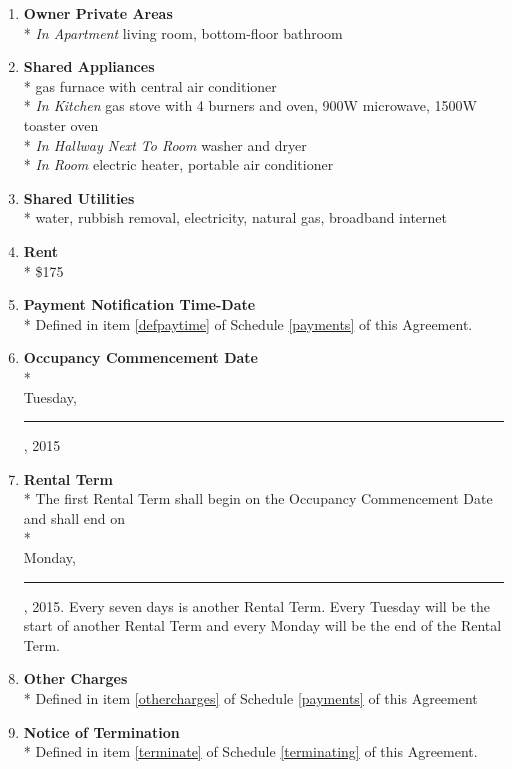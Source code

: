 \documentclass[]{article}
\newcommand{\datefillin}{\hspace{0.2cm}\rule{3cm}{.1pt}}
\newcommand{\apt}{Apartment}
\newcommand{\room}{Room}
\newcommand{\livingroom}{Owner Private Areas}
\newcommand{\appliances}{Shared Appliances}
\newcommand{\utilities}{Shared Utilities}
\newcommand{\firstday}{Occupancy Commencement Date}
\newcommand{\rentweek}{Rental Term}
\newcommand{\rent}{\$175}
\newcommand{\paymenttime}{Payment Notification Time-Date}
\begin{document}
\begin{multicols}{2}
\begin{enumerate}
		\item \textbf{\livingroom{}}\\* \label{livingroom}
			\textit{In \apt{}}
			living room,
			bottom-floor bathroom
			
		\item \textbf{\appliances}\\* \label{appliances}
			gas furnace with central air conditioner\\*
			\textit{In Kitchen} 
			gas stove with 4 burners and oven, 
			900W microwave,
			1500W toaster oven\\*
			\textit{In Hallway Next To \room{}}
			washer and dryer\\*
			\textit{In \room{}} 
			electric heater,
			portable air conditioner
			
		\item \textbf{\utilities{}}\\* \label{utilities}
			water,
			rubbish removal,
			electricity,
			natural gas,
			broadband internet

		\item \textbf{Rent}\\* \label{rent}
			\rent{}

		\item \textbf{\paymenttime{}}\\* \label{paymenttime}
			Defined in item \ref{defpaytime} of Schedule \ref{payments} of this Agreement.

		\item \textbf{\firstday{}} \label{firstday} \\* \\
			Tuesday, \datefillin, 2015

		\item \textbf{\rentweek{}}\\* \label{rentweek}
			The first \rentweek{} shall begin on the \firstday{} and shall end on \\* \\
			Monday, \datefillin, 2015. Every seven days is another \rentweek{}. Every Tuesday will be the start of another \rentweek{} and every Monday will be the end of the \rentweek{}.
			
		\item \textbf{Other Charges}\\*
			Defined in item \ref{othercharges} of Schedule \ref{payments} of this Agreement
			
		\item \textbf{Notice of Termination}\\* \label{noticeoftermination}
			Defined in item \ref{terminate} of Schedule \ref{terminating} of this Agreement.


\end{enumerate}
\end{multicols}
\end{document}
